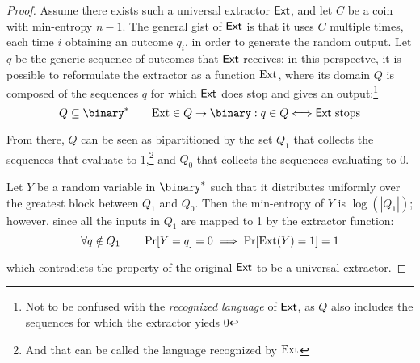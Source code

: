 \begin{proof}
    Assume there exists such a universal extractor $\textup{\textsf{Ext}}$, and let $C$ be a coin with min-entropy $n - 1$. The general gist of $\textup{\textsf{Ext}}$ is that it uses $C$ multiple times, each time $i$ obtaining an outcome $q_i$, in order to generate the random output. Let $q$ be the generic sequence of outcomes that $\textup{\textsf{Ext}}$ receives; in this perspectve, it is possible to reformulate the extractor as a function $\textrm{\textup{Ext}}$, where its domain $Q$ is composed of the sequences $q$ for which $\textup{\textsf{Ext}}$ does stop and gives an output:\footnote{Not to be confused with the \emph{recognized language} of $\textup{\textsf{Ext}}$, as $Q$ also includes the sequences for which the extractor yieds 0}
    \[
        Q \subseteq \binary^* \qquad \Extf \in Q \to \binary : q \in Q \Longleftrightarrow \Extm \textrm{ stops}
    \]

    From there, $Q$ can be seen as bipartitioned by the set $Q_1$ that collects the sequences that evaluate to 1,\footnote{And that can be called the language recognized by $\textrm{\textup{Ext}}$} and $Q_0$ that collects the sequences evaluating to 0.


    Let $Y$ be a random variable in $\binary^*$ such that it distributes uniformly over the greatest block between $Q_1$ and $Q_0$. Then the min-entropy of $Y$ is $\log(|Q_1|)$; however, since all the inputs in $Q_1$ are mapped to 1 by the extractor function:
    \[
        \forall q \notin Q_1 \qquad \Pr[Y = q] = 0 \implies \Pr[\textrm{\textup{Ext}}(Y) = 1] = 1
    \]

    which contradicts the property of the original $\textup{\textsf{Ext}}$ to be a universal extractor.
\end{proof}

%

